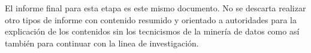 El informe final para esta etapa es este mismo documento. No se descarta realizar otro tipos de informe con contenido resumido y orientado a autoridades para la explicación de los contenidos sin los tecnicismos de la minería de datos como así también para continuar con la linea de investigación.